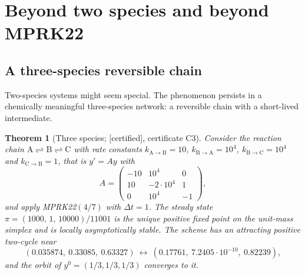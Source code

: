 \documentclass[11pt,a4paper]{article}
\theoremstyle{plain}
\newtheorem{theorem}{Theorem}
\theoremstyle{definition}
\newcommand{\status}[1]{\textsf{[#1]}}
\begin{document}
\section{Beyond two species and beyond MPRK22}\label{sec:beyond}

\subsection{A three-species reversible chain}

Two-species systems might seem special. The phenomenon persists in a chemically meaningful three-species network: a reversible chain with a short-lived intermediate.

\begin{theorem}[Three species; \status{certified}, certificate C3]\label{thm:three}
Consider the reaction chain $\mathrm A\rightleftharpoons\mathrm B\rightleftharpoons\mathrm C$ with rate constants $k_{\mathrm A\to\mathrm B}=10$, $k_{\mathrm B\to\mathrm A}=10^4$, $k_{\mathrm B\to\mathrm C}=10^4$ and $k_{\mathrm C\to\mathrm B}=1$, that is $y'=Ay$ with
\[
 A=\begin{pmatrix}-10&10^4&0\\10&-2\cdot10^4&1\\0&10^4&-1\end{pmatrix},
\]
and apply MPRK22$(4/7)$ with $\Delta t=1$. The steady state $\pi=(1000,\,1,\,10000)/11001$ is the unique positive fixed point on the unit-mass simplex and is locally asymptotically stable. The scheme has an attracting positive two-cycle near
\[
 (0.035874,\ 0.33085,\ 0.63327)\ \leftrightarrow\ (0.17761,\ 7.2405\cdot10^{-10},\ 0.82239),
\]
and the orbit of $y^0=(1/3,1/3,1/3)$ converges to it.
\end{theorem}
\end{document}
